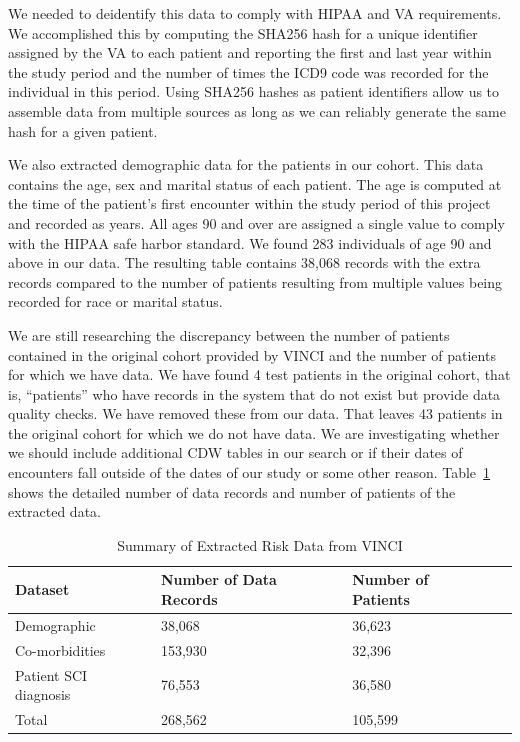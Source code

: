 \documentclass{amia}
\begin{document}
We needed to deidentify this data to comply with HIPAA and VA requirements. We accomplished this by computing the SHA256 hash for a unique identifier assigned by the VA to each patient and reporting the first and last year within the study period and the number of times the ICD9 code was recorded for the individual in this period.  Using SHA256 hashes as patient identifiers allow us to assemble data from multiple sources as long as we can reliably generate the same hash for a given patient.

We also extracted demographic data for the patients in our cohort.  This data contains the age, sex and marital status of each patient. The age is computed at the time of the patient's first encounter within the study period of this project and recorded as years. All ages 90 and over are assigned a single value to comply with the HIPAA safe harbor standard.  We found 283 individuals of age 90 and above in our data. The resulting table contains 38,068 records with the extra records compared to the number of patients resulting from multiple values being recorded for race or marital status.

We are still researching the discrepancy between the number of patients contained in the original cohort provided by VINCI and the number of patients for which we have data.  We have found 4 test patients in the original cohort, that is, ``patients'' who have records in the system that do not exist but provide data quality checks.  We have removed these from our data.  That leaves 43 patients in the original cohort for which we do not have data.  We are investigating whether we should include additional CDW tables in our search or if their dates of encounters fall outside of the dates of our study or some other reason. Table~\ref{summary} shows the detailed number of data records and number of patients of the extracted data.

\begin{table}[!ht]
\centering
  \begin{tabular}{|l|l|l|l|}
  \hline
    \textbf{Dataset}  & \textbf{Number of Data Records} & \textbf{Number of Patients} \\ \hline
    Demographic            &  38,068  & 36,623 \\ \hline
    Co-morbidities         & 153,930  & 32,396 \\ \hline
    Patient SCI diagnosis  &  76,553  & 36,580 \\ \hline
    Total & 268,562 & 105,599 \\ \hline
  \end{tabular}
  \caption{Summary of Extracted Risk Data from VINCI}
  \label{summary}
\end{table}
\end{document}
